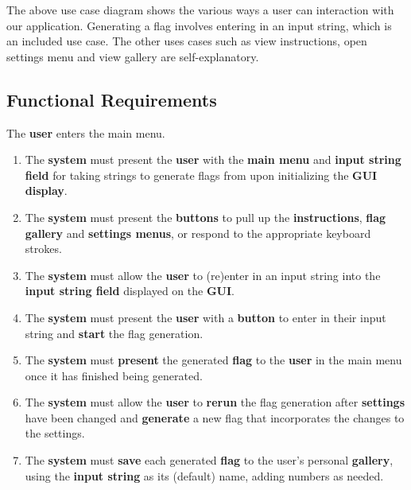 \documentclass[12pt, titlepage]{article}
\begin{document}
\noindent The above use case diagram shows the various ways a user can interaction with our application. Generating a flag involves entering in an input string, which is an included use case. The other uses cases such as view instructions, open settings menu and view gallery are self-explanatory.

\pagebreak

\subsection{Functional Requirements}

\begin{enumerate}[label=BE\arabic*.]
    \begin{item}
        The \textbf{user} enters the main menu.
        \begin{enumerate}[label=FR\arabic*., series=frs]
            \item The \textbf{system} must present the \textbf{user} with the \textbf{main menu} and \textbf{input string field} for taking strings to generate flags from upon initializing the \textbf{GUI display}.
            
            \item The \textbf{system} must present the \textbf{buttons} to pull up the \textbf{instructions}, \textbf{flag gallery} and \textbf{settings menus}, or respond to the appropriate keyboard strokes.

            \item The \textbf{system} must allow the \textbf{user} to (re)enter in an input string into the \textbf{input string field} displayed on the \textbf{GUI}.

            \item The \textbf{system} must present the \textbf{user} with a \textbf{button} to enter in their input string and \textbf{start} the flag generation.

            \item The \textbf{system} must \textbf{present} the generated \textbf{flag} to the \textbf{user} in the main menu once it has finished being generated.

            \item The \textbf{system} must allow the \textbf{user} to \textbf{rerun} the flag generation after \textbf{settings} have been changed and \textbf{generate} a new flag that incorporates the changes to the settings.

            \item The \textbf{system} must \textbf{save} each generated \textbf{flag} to the user’s personal \textbf{gallery}, using the \textbf{input string} as its (default) name, adding numbers as needed.
        \end{enumerate}
    \end{item}


\end{enumerate}
\end{document}
